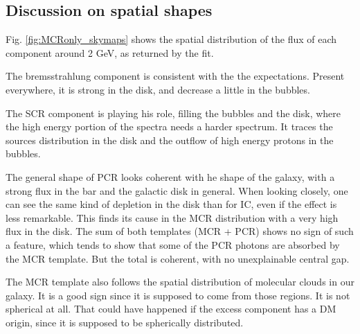 \subsection{Discussion on spatial shapes}

Fig. \ref{fig:MCRonly_skymaps} shows the spatial distribution of the flux of each component around 2 GeV, as returned by the fit.

The bremsstrahlung component is consistent with the the expectations. Present everywhere, it is strong in the disk, and decrease a little in the bubbles.


The SCR component is playing his role, filling the bubbles and the disk, where the high energy portion of the spectra needs a harder spectrum. It traces the sources distribution in the disk and the outflow of high energy protons in the bubbles.

The general shape of PCR looks coherent with he shape of the galaxy, with a strong flux in the bar and the galactic disk in general. When looking closely, one can see the same kind of depletion in the disk than for IC, even if the effect is less remarkable. This finds its cause in the MCR distribution with a very high flux in the disk. The sum of both templates (MCR + PCR) shows no sign of such a feature, which tends to show that some of the PCR photons are absorbed by the MCR template. But the total is coherent, with no unexplainable central gap.

The MCR template also follows the spatial distribution of molecular clouds in our galaxy. It is a good sign since it is supposed to come from those regions.
It is not spherical at all. That could have happened if the excess component has a DM origin, since it is supposed to be spherically distributed.














